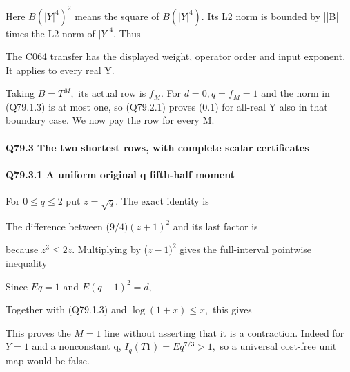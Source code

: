 Here \(B(|Y|^4)^2\) means the square of \(B(|Y|^4).\) Its L2 norm is
bounded by ||B|| times the L2 norm of \(|Y|^4.\) Thus


The C064 transfer has the displayed weight, operator order and
input exponent. It applies to every real Y.

Taking \(B=T^M,\allowbreak \) its actual row is \(\bar f_{M}.\) For \(d=0,\allowbreak  q=\bar f_{M}=1\) and
the norm in (Q79.1.3) is at most one, so (Q79.2.1) proves (0.1) for all-real
Y also in that boundary case. We now pay the row for every M.

\paragraph{Q79.3 The two shortest rows, with complete scalar certificates}

\paragraph{Q79.3.1 A uniform original q fifth-half moment}

For \(0\le q\le 2\) put \(z=\sqrt{q}.\) The exact identity is


The difference between (\(9/4)(z+1)^2\) and its last factor is


because \(z^3\le 2z.\) Multiplying by (\(z-1)^2\) gives the full-interval
pointwise inequality


Since \(Eq=1\) and \(E(q-1)^2=d,\allowbreak \)


Together with (Q79.1.3) and \(\log(1+x)\le x,\allowbreak \) this gives


This proves the \(M=1\) line without asserting that it is a contraction.
Indeed for \(Y=1\) and a nonconstant q, \(I_q(T1)=E q^{7/3}>1,\allowbreak \) so a
universal cost-free unit map would be false.

